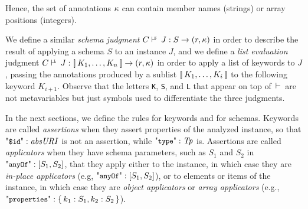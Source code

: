 Hence, the set of annotations $\kappa$ can contain member names (strings) or array positions (integers).

We define a similar \emph{schema judgment} $\SJudgCJ{S}\Ret{r}{(r,\ps)}$
in order to describe the result of applying a schema $S$ to an instance $J$,
and we define a 
\emph{list evaluation} judgment
$\KLJudgCJ{\List{K_1,\ldots,K_n}}\Ret{}{(r,\pkl)}$ in order to apply a list of keywords to $J$, 
passing the annotations produced by a sublist $[\!|\,{K_1,\ldots,K_i}\,|\!]$ to the following keyword $K_{i+1}$.
Observe that the letters {\tt \small{K}}, {\tt \small{S}}, and {\tt \small{L}} that appear on top of $\,\StackDash{}{}\!$ are not
metavariables but just symbols used to differentiate the three judgments.


In the next sections, we define the rules for keywords and for schemas.
Keywords are called \emph{assertions} when they assert properties of the analyzed instance,
so that $\qdid: \key{absURI}$ is not an assertion, while $\qtype:\key{Tp}$ is.
Assertions are called \emph{applicators} when they have schema parameters,
such as $S_1$ and $S_2$ in $\qany : [ S_1, S_2 ]$, that they apply either to the instance,
in which case they are \emph{in-place applicators} (e.g, $\qany : [ S_1, S_2 ]$), 
or to elements or items of the instance, in which
case they are \emph{object applicators} or \emph{array applicators} (e.g., $\qprops: \JObj{k_1:S_1, k_2:S_2}$).

